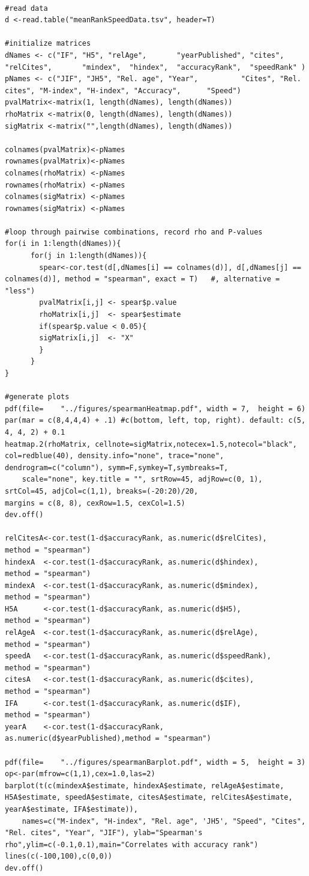 \documentclass[fleqn,10pt]{SelfArx} %
\begin{document}
{\tiny
\begin{verbatim}

#read data
d <-read.table("meanRankSpeedData.tsv", header=T)

#initialize matrices
dNames <- c("IF", "H5", "relAge",       "yearPublished", "cites", "relCites",       "mindex",  "hindex",  "accuracyRank",  "speedRank" )
pNames <- c("JIF", "JH5", "Rel. age", "Year",          "Cites", "Rel. cites", "M-index", "H-index", "Accuracy",      "Speed")
pvalMatrix<-matrix(1, length(dNames), length(dNames))
rhoMatrix <-matrix(0, length(dNames), length(dNames))
sigMatrix <-matrix("",length(dNames), length(dNames))

colnames(pvalMatrix)<-pNames
rownames(pvalMatrix)<-pNames
colnames(rhoMatrix) <-pNames
rownames(rhoMatrix) <-pNames
colnames(sigMatrix) <-pNames
rownames(sigMatrix) <-pNames

#loop through pairwise combinations, record rho and P-values 
for(i in 1:length(dNames)){
      for(j in 1:length(dNames)){
	    spear<-cor.test(d[,dNames[i] == colnames(d)], d[,dNames[j] == colnames(d)], method = "spearman", exact = T)   #, alternative = "less")
	    pvalMatrix[i,j] <- spear$p.value 
	    rhoMatrix[i,j]  <- spear$estimate
	    if(spear$p.value < 0.05){
		sigMatrix[i,j]  <- "X"
	    }
      }
}

#generate plots
pdf(file=    "../figures/spearmanHeatmap.pdf", width = 7,  height = 6)
par(mar = c(8,4,4,4) + .1) #c(bottom, left, top, right). default: c(5, 4, 4, 2) + 0.1
heatmap.2(rhoMatrix, cellnote=sigMatrix,notecex=1.5,notecol="black", col=redblue(40), density.info="none", trace="none", dendrogram=c("column"), symm=F,symkey=T,symbreaks=T,
	scale="none", key.title = "", srtRow=45, adjRow=c(0, 1), srtCol=45, adjCol=c(1,1), breaks=(-20:20)/20,
margins = c(8, 8), cexRow=1.5, cexCol=1.5)
dev.off()

relCitesA<-cor.test(1-d$accuracyRank, as.numeric(d$relCites),     method = "spearman")
hindexA  <-cor.test(1-d$accuracyRank, as.numeric(d$hindex),       method = "spearman")
mindexA  <-cor.test(1-d$accuracyRank, as.numeric(d$mindex),       method = "spearman")
H5A      <-cor.test(1-d$accuracyRank, as.numeric(d$H5),           method = "spearman")
relAgeA  <-cor.test(1-d$accuracyRank, as.numeric(d$relAge),       method = "spearman")
speedA   <-cor.test(1-d$accuracyRank, as.numeric(d$speedRank),    method = "spearman")
citesA   <-cor.test(1-d$accuracyRank, as.numeric(d$cites),        method = "spearman")
IFA      <-cor.test(1-d$accuracyRank, as.numeric(d$IF),           method = "spearman")
yearA    <-cor.test(1-d$accuracyRank, as.numeric(d$yearPublished),method = "spearman")

pdf(file=    "../figures/spearmanBarplot.pdf", width = 5,  height = 3)
op<-par(mfrow=c(1,1),cex=1.0,las=2)
barplot(t(c(mindexA$estimate, hindexA$estimate, relAgeA$estimate, H5A$estimate, speedA$estimate, citesA$estimate, relCitesA$estimate, yearA$estimate, IFA$estimate)),
	names=c("M-index", "H-index", "Rel. age", 'JH5', "Speed", "Cites", "Rel. cites", "Year", "JIF"), ylab="Spearman's rho",ylim=c(-0.1,0.1),main="Correlates with accuracy rank")
lines(c(-100,100),c(0,0))
dev.off()
\end{verbatim}
}
\end{document}

